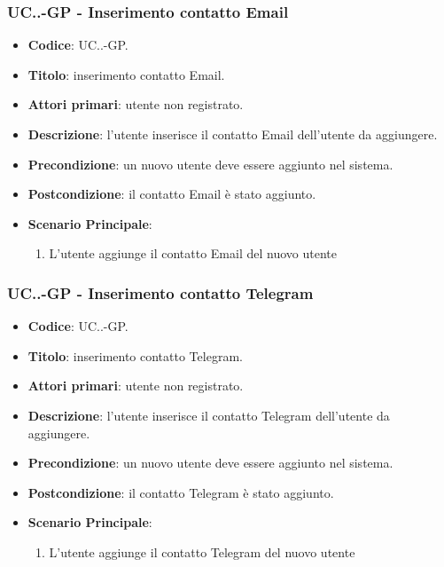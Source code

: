 		\subsubsection{UC\theuccount.\thesubuccount.\thesubsubuccount-GP - Inserimento contatto Email}
			
			\begin{itemize}
				\item \textbf{Codice}: UC\theuccount.\thesubuccount.\thesubsubuccount-GP.
				\item \textbf{Titolo}: inserimento contatto Email.
				\item \textbf{Attori primari}: utente non registrato.
				\item \textbf{Descrizione}: l'utente inserisce il contatto Email dell'utente da aggiungere.
				\item \textbf{Precondizione}: un nuovo utente deve essere aggiunto nel sistema.
				\item \textbf{Postcondizione}: il contatto Email è stato aggiunto.
				\item \textbf{Scenario Principale}:
				\begin{enumerate}
					\item L'utente aggiunge il contatto Email del nuovo utente
				\end{enumerate}
		\end{itemize}
		
		\subsubsection{UC\theuccount.\thesubuccount.\thesubsubuccount-GP - Inserimento contatto Telegram}
			
			\begin{itemize}
				\item \textbf{Codice}: UC\theuccount.\thesubuccount.\thesubsubuccount-GP.
				\item \textbf{Titolo}: inserimento contatto Telegram.
				\item \textbf{Attori primari}: utente non registrato.
				\item \textbf{Descrizione}: l'utente inserisce il contatto Telegram dell'utente da aggiungere.
				\item \textbf{Precondizione}: un nuovo utente deve essere aggiunto nel sistema.
				\item \textbf{Postcondizione}: il contatto Telegram è stato aggiunto.
				\item \textbf{Scenario Principale}:
				\begin{enumerate}
					\item L'utente aggiunge il contatto Telegram del nuovo utente
				\end{enumerate}
			\end{itemize}
	
